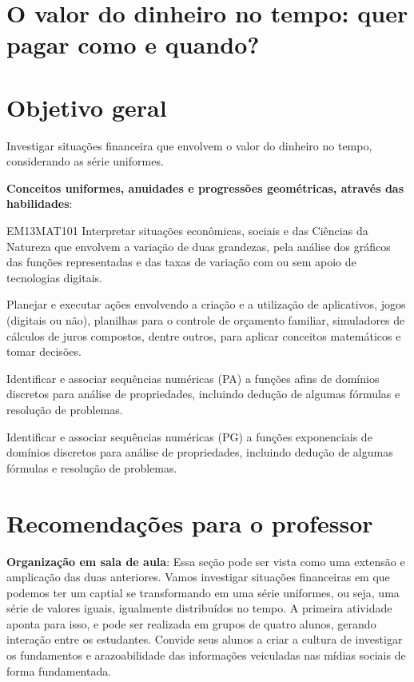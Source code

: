 \begin{paginatexto2}
\section*{O valor do dinheiro no tempo: quer pagar como e quando?}

\section*{Objetivo geral}
Investigar situações financeira que envolvem o valor do dinheiro no tempo, considerando as série uniformes.

\textbf{Conceitos uniformes, anuidades e progressões geométricas, através das habilidades}:

\begin{objetivos}{EM13MAT101}
 Interpretar situações econômicas, sociais e das Ciências da Natureza
que envolvem a variação de duas grandezas, pela análise dos gráficos das funções representadas e das taxas de variação com ou sem apoio de tecnologias digitais.

Planejar e executar ações envolvendo a criação e a utilização de aplicativos, jogos (digitais ou não), planilhas para o controle de orçamento familiar, simuladores de cálculos de juros compostos, dentre outros, para aplicar conceitos matemáticos e tomar decisões. 

Identificar e associar sequências numéricas (PA) a funções afins de domínios discretos para análise de propriedades, incluindo dedução de algumas fórmulas e resolução de problemas.

Identificar e associar sequências numéricas (PG) a funções exponenciais de domínios discretos para análise de propriedades, incluindo dedução de algumas fórmulas e resolução de problemas.
\end{objetivos}

\section*{Recomendações para o professor}

\textbf{Organização em sala de aula}: Essa seção pode ser vista como uma extensão e amplicação das duas anteriores. Vamos investigar situações financeiras em que podemos ter um captial se transformando em uma série uniformes, ou seja, uma série de valores iguais, igualmente distribuídos no tempo. A primeira atividade aponta para isso, e pode ser realizada em grupos de quatro alunos, gerando interação entre os estudantes. Convide seus alunos a criar a cultura de investigar os fundamentos e arazoabilidade das informações veiculadas nas mídias sociais de forma fundamentada.


\end{paginatexto2}
